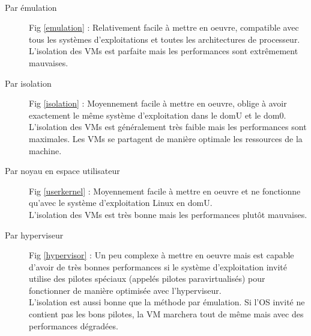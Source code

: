\paragraph*{}
\begin{description}

	\item[Par émulation] Fig \ref{emulation} : Relativement facile à mettre en oeuvre, compatible avec tous les systèmes d'exploitations et toutes les architectures
	de processeur.\\
	L'isolation des VMs est parfaite mais les performances sont extrêmement mauvaises.

	\item[Par isolation] Fig \ref{isolation} : Moyennement facile à mettre en oeuvre, oblige à avoir exactement le même système d'exploitation dans le domU et le dom0.\\
	L'isolation des VMs est généralement très faible mais les performances sont maximales. Les VMs se partagent de manière optimale les ressources de la machine.

	\item[Par noyau en espace utilisateur] Fig \ref{userkernel} : Moyennement facile à mettre en oeuvre et ne fonctionne qu'avec le système d'exploitation Linux en domU.\\
	L'isolation des VMs est très bonne mais les performances plutôt mauvaises.

	\item[Par hyperviseur] Fig \ref{hypervisor} : Un peu complexe à mettre en oeuvre mais est capable d'avoir de très bonnes performances si le système d'exploitation invité
	utilise des pilotes spéciaux (appelés pilotes paravirtualisés) pour fonctionner de manière optimisée avec l'hyperviseur.\\
	L'isolation est aussi bonne que la méthode par émulation. Si l'OS invité ne contient pas les bons pilotes, la VM marchera tout de même mais
	avec des performances dégradées.

\end{description}

